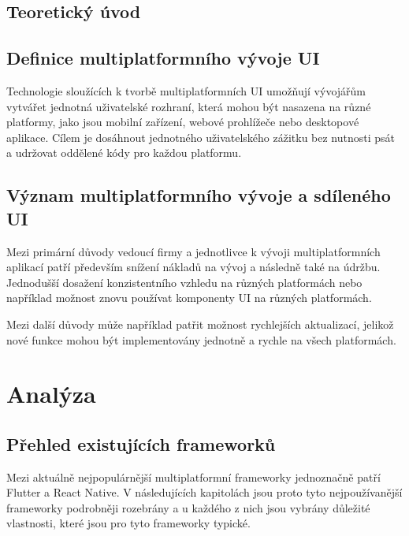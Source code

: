 \section{Teoretický úvod}

\section{Definice multiplatformního vývoje UI}

Technologie sloužících k tvorbě multiplatformních UI umožňují vývojářům vytvářet jednotná uživatelské rozhraní, 
která mohou být nasazena na různé platformy, jako jsou mobilní zařízení, webové prohlížeče nebo desktopové aplikace. 
Cílem je dosáhnout jednotného uživatelského zážitku bez nutnosti psát a udržovat oddělené kódy pro každou platformu.


\section{Význam multiplatformního vývoje a sdíleného UI}

Mezi primární důvody vedoucí firmy a jednotlivce k vývoji multiplatformních aplikací patří především
snížení nákladů na vývoj a následně také na údržbu. Jednodušší dosažení konzistentního vzhledu
na různých platformách nebo například možnost znovu používat komponenty UI na různých platformách.

Mezi další důvody může například patřit možnost rychlejších aktualizací, jelikož nové funkce mohou být 
implementovány jednotně a rychle na všech platformách. 




\chapter{Analýza}

\section{Přehled existujících frameworků}
Mezi aktuálně nejpopulárnější multiplatformní frameworky jednoznačně patří Flutter a React Native. \cite{crossPlatformFrameworksStats}
V následujících kapitolách jsou proto tyto nejpoužívanější frameworky podrobněji rozebrány a u každého z nich jsou vybrány 
důležité vlastnosti, které jsou pro tyto frameworky typické. 

